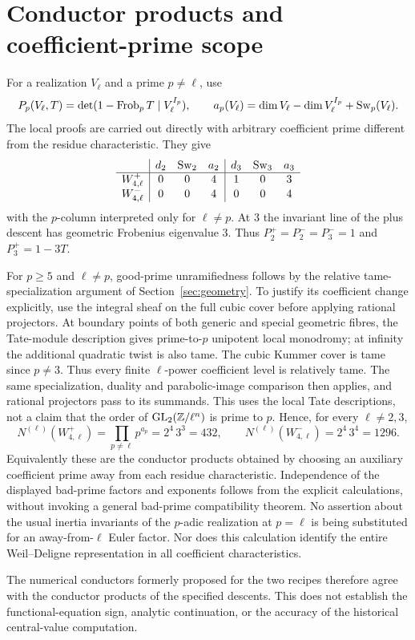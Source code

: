 \section{Conductor products and coefficient-prime scope}\label{sec:conductors}
For a realization $V_\ell$ and a prime $p\ne\ell$, use
\[
 P_p(V_\ell,T)=\det(1-\operatorname{Frob}_pT\mid V_\ell^{I_p}),\qquad
 a_p(V_\ell)=\dim V_\ell-\dim V_\ell^{I_p}+\operatorname{Sw}_p(V_\ell).
\]
The local proofs are carried out directly with arbitrary coefficient prime
different from the residue characteristic. They give
\[
\begin{array}{c|ccc|ccc}
 &d_2&\operatorname{Sw}_2&a_2&d_3&\operatorname{Sw}_3&a_3\\\hline
 W_{4,\ell}^+&0&0&4&1&0&3\\
 W_{4,\ell}^-&0&0&4&0&0&4
\end{array}
\]
with the $p$-column interpreted only for $\ell\ne p$. At $3$ the invariant
line of the plus descent has geometric Frobenius eigenvalue $3$.
Thus $P_2^+=P_2^-=P_3^-=1$ and $P_3^+=1-3T$.

For $p\ge5$ and $\ell\ne p$, good-prime unramifiedness follows by the
relative tame-specialization argument of Section~\ref{sec:geometry}.
To justify its coefficient change explicitly, use the integral sheaf on
the full cubic cover before applying rational projectors. At boundary points of both generic and special geometric fibres,
the Tate-module description gives prime-to-$p$ unipotent local
monodromy; at infinity the additional quadratic twist is also tame.
The cubic Kummer cover is tame since $p\ne3$. Thus every finite
$\ell$-power coefficient level is relatively tame. The same specialization,
duality and parabolic-image comparison then applies, and rational
projectors pass to its summands. This uses the local Tate descriptions,
not a claim that the order of $\operatorname{GL}_2(\mathbb Z/\ell^n)$ is prime to $p$.
Hence, for every $\ell\ne2,3$,
\[
 N^{(\ell)}(W_{4,\ell}^+)=\prod_{p\ne\ell}p^{a_p}=2^4\,3^3=432,
 \qquad
 N^{(\ell)}(W_{4,\ell}^-)=2^4\,3^4=1296.
\]
Equivalently these are the conductor products obtained by choosing an
auxiliary coefficient prime away from each residue characteristic.
Independence of the displayed bad-prime factors and exponents follows
from the explicit calculations, without invoking a general bad-prime
compatibility theorem. No assertion about the usual inertia invariants
of the $p$-adic realization at $p=\ell$ is being substituted for an
away-from-$\ell$ Euler factor. Nor does this calculation identify the
entire Weil--Deligne representation in all coefficient characteristics.

The numerical conductors formerly proposed for the two recipes therefore
agree with the conductor products of the specified descents. This does
not establish the functional-equation sign, analytic continuation, or
the accuracy of the historical central-value computation.
